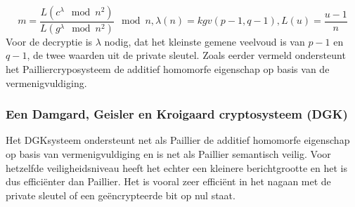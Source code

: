 \begin{equation}\label{paillierdec} m = \frac{L(c^{\lambda}\mod n^2)}{L(g^{\lambda} \mod n^2)}\mod n, \lambda(n) =kgv (p-1,q-1), L(u)=\frac{u-1}{n}
\end{equation}
Voor de decryptie is $\lambda$ nodig, dat het kleinste gemene veelvoud is van $p-1$ en $q-1$, de twee waarden uit de private sleutel. Zoals eerder vermeld ondersteunt het Pailliercryposysteem de additief homomorfe eigenschap op basis van de vermenigvuldiging. 
\begin{comment}
Deze eigenschap kan snel aangetoond worden. 
\end{comment}
\subsubsection{Een Damgard, Geisler en Kroigaard cryptosysteem (DGK)}
\label{dgk}
Het DGKsysteem ondersteunt net als Paillier de additief homomorfe eigenschap op basis van vermenigvuldiging en is net als Paillier semantisch veilig. Voor hetzelfde veiligheidsniveau heeft het echter een kleinere berichtgrootte en het is dus effici\"enter dan Paillier. Het is vooral zeer effici\"ent in het nagaan met de private sleutel of een ge\"encrypteerde bit op nul staat.